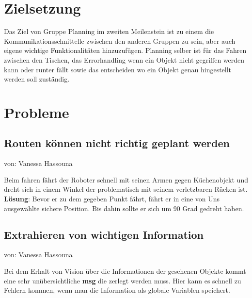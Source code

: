 \documentclass{suturo}
\begin{document}

\makeatletter
\newcommand{\chapterauthor}[1]{%
  {\parindent0pt\vspace*{-47pt}%
  \linespread{2.2}\large\begin{flushright}von: #1\end{flushright}%
  \par\nobreak\vspace*{0pt}}
  \@afterheading%
}
\makeatother

\section*{Zielsetzung}
Das Ziel von Gruppe Planning im zweiten Meilenstein ist zu einem die Kommunikationsschnittelle zwischen den anderen Gruppen zu sein, aber auch eigene wichtige Funktionalitäten hinzuzufügen. Planning selber ist für das Fahren zwischen den Tischen, das Errorhandling wenn ein Objekt nicht gegriffen werden kann oder runter fällt sowie das entscheiden wo ein Objekt genau hingestellt werden soll zuständig.
 

\section*{Probleme}
\subsection*{Routen können nicht richtig geplant werden}
\chapterauthor{Vanessa Hassouna}
Beim fahren fährt der Roboter schnell mit seinen Armen gegen Küchenobjekt und dreht sich in einem Winkel der problematisch mit seinem verletzbaren Rücken ist.\\


\textbf{Lösung}: Bevor er zu dem gegeben Punkt fährt, fährt er in eine von Uns ausgewählte sichere Position. Bis dahin sollte er sich um 90 Grad gedreht haben.

\subsection*{Extrahieren von wichtigen Information}
\chapterauthor{Vanessa Hassouna}
Bei dem Erhalt von Vision über die Informationen der gesehenen Objekte kommt eine sehr unübersichtliche \textbf{msg} die zerlegt werden muss. Hier kann es schnell zu Fehlern kommen, wenn man die Information als globale Variablen speichert. \\
\end{document}
